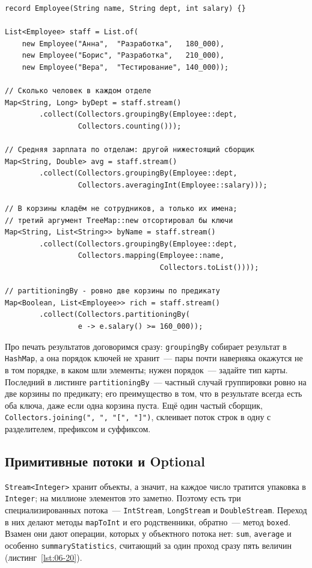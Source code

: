 \begin{listing}[H]
\begin{verbatim}
record Employee(String name, String dept, int salary) {}

List<Employee> staff = List.of(
    new Employee("Анна",  "Разработка",   180_000),
    new Employee("Борис", "Разработка",   210_000),
    new Employee("Вера",  "Тестирование", 140_000));

// Сколько человек в каждом отделе
Map<String, Long> byDept = staff.stream()
        .collect(Collectors.groupingBy(Employee::dept,
                 Collectors.counting()));

// Средняя зарплата по отделам: другой нижестоящий сборщик
Map<String, Double> avg = staff.stream()
        .collect(Collectors.groupingBy(Employee::dept,
                 Collectors.averagingInt(Employee::salary)));

// В корзины кладём не сотрудников, а только их имена;
// третий аргумент TreeMap::new отсортировал бы ключи
Map<String, List<String>> byName = staff.stream()
        .collect(Collectors.groupingBy(Employee::dept,
                 Collectors.mapping(Employee::name,
                                    Collectors.toList())));

// partitioningBy - ровно две корзины по предикату
Map<Boolean, List<Employee>> rich = staff.stream()
        .collect(Collectors.partitioningBy(
                 e -> e.salary() >= 160_000));
\end{verbatim}
\caption{Сборка, группировка и разбиение}
\label{lst:06-19}
\end{listing}

Про печать результатов договоримся сразу: \texttt{groupingBy} собирает
результат в \texttt{HashMap}, а она порядок ключей не хранит~--- пары почти
наверняка окажутся не в том порядке, в каком шли элементы; нужен порядок~---
задайте тип карты. Последний в листинге \texttt{partitioningBy}~--- частный
случай группировки ровно на две корзины по предикату; его преимущество в том,
что в результате всегда есть оба ключа, даже если одна корзина пуста. Ещё один
частый сборщик, \texttt{Collectors.joining(", ", "[", "]")}, склеивает поток
строк в одну с разделителем, префиксом и суффиксом.

\subsection{Примитивные потоки и Optional}

\texttt{Stream<Integer>} хранит объекты, а значит, на каждое число тратится
упаковка в \texttt{Integer}; на миллионе элементов это заметно. Поэтому есть
три специализированных потока~--- \texttt{IntStream}, \texttt{LongStream} и
\texttt{DoubleStream}. Переход в них делают методы \texttt{mapToInt} и его
родственники, обратно~--- метод \texttt{boxed}. Взамен они дают операции,
которых у объектного потока нет: \texttt{sum}, \texttt{average} и особенно
\texttt{summaryStatistics}, считающий за один проход сразу пять величин
(листинг~\ref{lst:06-20}).

